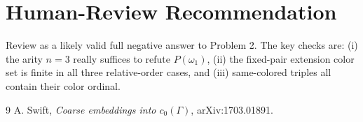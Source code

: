 \documentclass[11pt]{article}
\begin{document}
\section*{Human-Review Recommendation}

Review as a likely valid full negative answer to Problem 2.  The key checks are: (i) the arity \(n=3\) really suffices to refute \(P(\omega_1)\), (ii) the fixed-pair extension color set is finite in all three relative-order cases, and (iii) same-colored triples all contain their color ordinal.

\begin{thebibliography}{9}
A. Swift, \emph{Coarse embeddings into \(c_0(\Gamma)\)}, arXiv:1703.01891.
\end{thebibliography}
\end{document}
